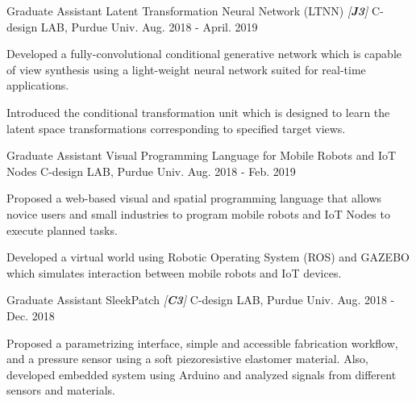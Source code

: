 \begin{cventries}

\cventry
{Graduate Assistant} %
{Latent Transformation Neural Network (LTNN) \textit{[\textbf{J3}]}} %
{C-design LAB, Purdue Univ.} %
{Aug. 2018 - April. 2019} %
{ %
\begin{cvitems}
\item {Developed a fully-convolutional conditional generative network which is capable of view synthesis using a light-weight neural network suited for real-time applications.}
\item {Introduced the conditional transformation unit which is designed to learn the latent space transformations corresponding to specified target views.}
\end{cvitems}
}


\cventry
{Graduate Assistant} %
{Visual Programming Language for Mobile Robots and IoT Nodes} %
{C-design LAB, Purdue Univ.} %
{Aug. 2018 - Feb. 2019} %
{ %
\begin{cvitems}
\item {Proposed a web-based visual and spatial programming language that allows novice users and small industries to program mobile robots and IoT Nodes to execute planned tasks.}
\item {Developed a virtual world using Robotic Operating System (ROS) and GAZEBO which simulates interaction between mobile robots and IoT devices.}
\end{cvitems} 
}


\cventry
{Graduate Assistant} %
{SleekPatch \textit{[\textbf{C3}]}} %
{C-design LAB, Purdue Univ.} %
{Aug. 2018 - Dec. 2018} %
{ %
\begin{cvitems}
\item {Proposed a parametrizing interface, simple and accessible fabrication workflow, and a pressure sensor using a soft piezoresistive elastomer material. Also, developed embedded system using Arduino and analyzed signals from different sensors and materials.}
\end{cvitems}
}



\end{cventries}
